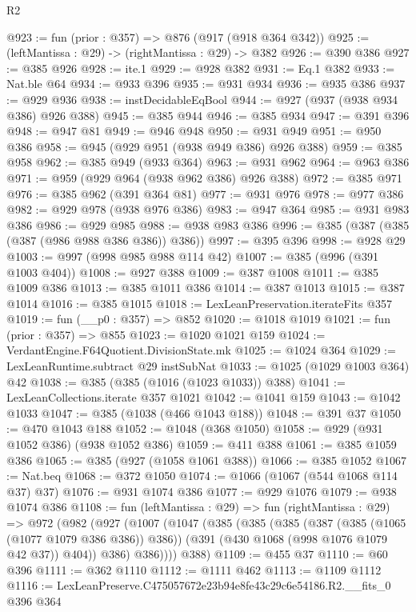 \begin{lexlean}{R2}
\begin{coremodule}
@923 := fun (prior : @357) => @876 (@917 (@918 @364 @342))
@925 := (leftMantissa : @29) -> (rightMantissa : @29) -> @382
@926 := @390 @386
@927 := @385 @926
@928 := ite.{1}
@929 := @928 @382
@931 := Eq.{1} @382
@933 := Nat.ble @64
@934 := @933 @396
@935 := @931 @934
@936 := @935 @386
@937 := @929 @936
@938 := instDecidableEqBool
@944 := @927 (@937 (@938 @934 @386) @926 @388)
@945 := @385 @944
@946 := @385 @934
@947 := @391 @396
@948 := @947 @81
@949 := @946 @948
@950 := @931 @949
@951 := @950 @386
@958 := @945 (@929 @951 (@938 @949 @386) @926 @388)
@959 := @385 @958
@962 := @385 @949 (@933 @364)
@963 := @931 @962
@964 := @963 @386
@971 := @959 (@929 @964 (@938 @962 @386) @926 @388)
@972 := @385 @971
@976 := @385 @962 (@391 @364 @81)
@977 := @931 @976
@978 := @977 @386
@982 := @929 @978 (@938 @976 @386)
@983 := @947 @364
@985 := @931 @983 @386
@986 := @929 @985
@988 := @938 @983 @386
@996 := @385 (@387 (@385 (@387 (@986 @988 @386 @386)) @386))
@997 := @395 @396
@998 := @928 @29
@1003 := @997 (@998 @985 @988 @114 @42)
@1007 := @385 (@996 (@391 @1003 @404))
@1008 := @927 @388
@1009 := @387 @1008
@1011 := @385 @1009 @386
@1013 := @385 @1011 @386
@1014 := @387 @1013
@1015 := @387 @1014
@1016 := @385 @1015
@1018 := LexLeanPreservation.iterateFits @357
@1019 := fun (__p0 : @357) => @852
@1020 := @1018 @1019
@1021 := fun (prior : @357) => @855
@1023 := @1020 @1021 @159
@1024 := VerdantEngine.F64Quotient.DivisionState.mk
@1025 := @1024 @364
@1029 := LexLeanRuntime.subtract @29 instSubNat
@1033 := @1025 (@1029 @1003 @364) @42
@1038 := @385 (@385 (@1016 (@1023 @1033)) @388)
@1041 := LexLeanCollections.iterate @357 @1021
@1042 := @1041 @159
@1043 := @1042 @1033
@1047 := @385 (@1038 (@466 @1043 @188))
@1048 := @391 @37
@1050 := @470 @1043 @188
@1052 := @1048 (@368 @1050)
@1058 := @929 (@931 @1052 @386) (@938 @1052 @386)
@1059 := @411 @388
@1061 := @385 @1059 @386
@1065 := @385 (@927 (@1058 @1061 @388))
@1066 := @385 @1052
@1067 := Nat.beq
@1068 := @372 @1050
@1074 := @1066 (@1067 (@544 @1068 @114 @37) @37)
@1076 := @931 @1074 @386
@1077 := @929 @1076
@1079 := @938 @1074 @386
@1108 := fun (leftMantissa : @29) =>
  fun (rightMantissa : @29) =>
  @972
    (@982
      (@927
        (@1007
          (@1047
            (@385
              (@385
                (@385
                  (@387 (@385 (@1065 (@1077 @1079 @386 @386)) @386))
                  (@391 (@430 @1068 (@998 @1076 @1079 @42 @37)) @404))
                @386)
              @386))))
      @388)
@1109 := @455 @37
@1110 := @60 @396
@1111 := @362 @1110
@1112 := @1111 @462
@1113 := @1109 @1112
@1116 := LexLeanPreserve.C475057672e23b94e8fe43c29c6e54186.R2.__fits_0 @396 @364

\end{coremodule}
\end{lexlean}
